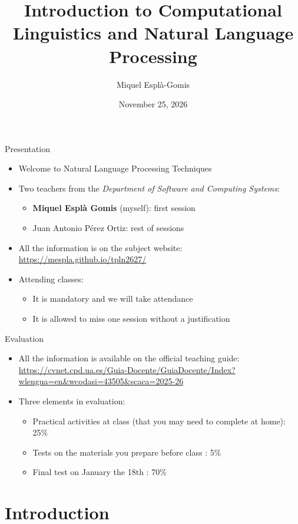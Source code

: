 \documentclass{beamer}
\title{Introduction to Computational Linguistics and Natural Language Processing}
\author{Miquel Esplà-Gomis}
\date{November 25, 2026}
\begin{document}
\frame{\titlepage}

\begin{frame}{Presentation}
    \begin{itemize}
        \item Welcome to \alert{Natural Language Processing Techniques}
        \item Two teachers from the \textit{Department of Software and Computing Systems}:
        \begin{itemize}
            \item \textbf{Miquel Esplà Gomis} (myself): first session
            \item Juan Antonio Pérez Ortiz: rest of sessions
        \end{itemize}
        \item All the information is on the subject website: \url{https://mespla.github.io/tpln2627/}
        \item Attending classes:
        \begin{itemize}
          \item It is mandatory and we will take attendance
          \item It is allowed to miss one session without a justification
        \end{itemize}
     \end{itemize}
\end{frame}

\begin{frame}{Evaluation}
    \begin{itemize}
        \item All the information is available on the official teaching guide: \url{https://cvnet.cpd.ua.es/Guia-Docente/GuiaDocente/Index?wlengua=en&wcodasi=43505&scaca=2025-26}
        \item Three elements in evaluation:
        \begin{itemize}
          \item Practical activities at class (that you may need to complete at home): \alert{25\%}
          \item Tests on the materials you prepare before class : \alert{5\%}
          \item Final test on January the 18th : \alert{70\%}
        \end{itemize}
     \end{itemize}
\end{frame}

\section{Introduction}
\end{document}
